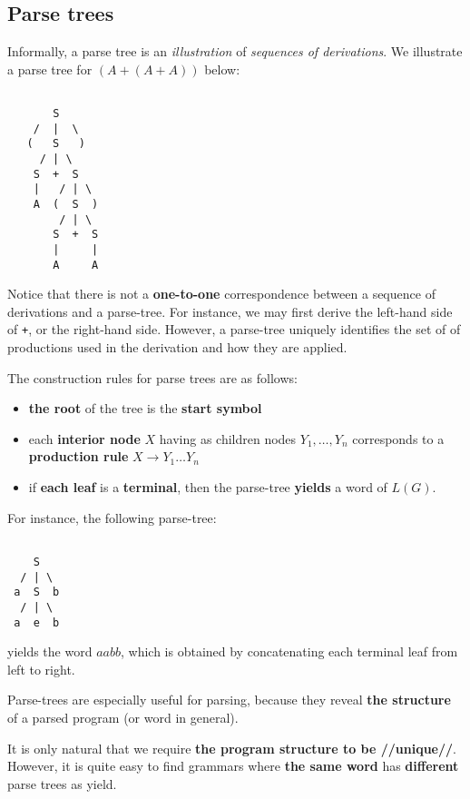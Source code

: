 \documentclass[a4paper, 12pt]{article}
\begin{document}
\subsection{ Parse trees }

Informally, a parse tree is an \textit{illustration} of \textit{sequences of derivations}. We illustrate a parse tree for $(A+(A+A))$ below:

\begin{verbatim}

       S
    /  |  \
   (   S   )
     / | \
    S  +  S
    |   / | \
    A  (  S  )
        / | \
       S  +  S
       |     |
       A     A

\end{verbatim}


Notice that there is not a \textbf{one-to-one} correspondence between a sequence of derivations and a parse-tree. For instance, we may first derive the left-hand side of \texttt{+}, or the right-hand side. However, a parse-tree uniquely identifies the set of of productions used in the derivation and how they are applied.

The construction rules for parse trees are as follows:
  \begin{itemize}
  	\item  \textbf{the root} of the tree is the \textbf{start symbol}
  	\item  each \textbf{interior node} $X$ having as children nodes $Y_1, \ldots, Y_n$ corresponds to a \textbf{production rule} $X\rightarrow Y_1 \ldots Y_n$
  	\item  if \textbf{each leaf} is a \textbf{terminal}, then the parse-tree \textbf{yields} a word of $L(G)$.
  \end{itemize}

For instance, the following parse-tree:


\begin{verbatim}

    S
  / | \
 a  S  b
  / | \
 a  e  b

\end{verbatim}

yields the word $aabb$, which is obtained by concatenating each terminal leaf from left to right.

Parse-trees are especially useful for parsing, because they reveal \textbf{the structure} of a parsed program (or word in general). 

It is only natural that we require \textbf{the program structure to be //unique//}. However, it is quite easy to find grammars where \textbf{the same word} has \textbf{different} parse trees as yield.
\end{document}

